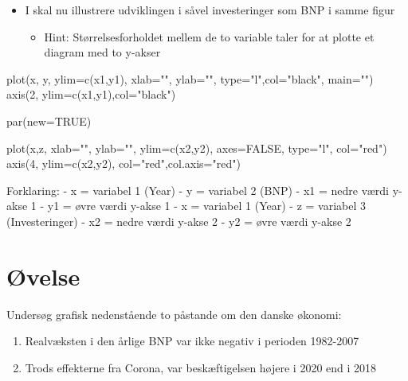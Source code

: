 \documentclass[
  12pt,
]{article}
\newenvironment{Shaded}{\begin{snugshade}}{\end{snugshade}}
\newcommand{\AttributeTok}[1]{\textcolor[rgb]{0.77,0.63,0.00}{#1}}
\newcommand{\ConstantTok}[1]{\textcolor[rgb]{0.00,0.00,0.00}{#1}}
\newcommand{\DecValTok}[1]{\textcolor[rgb]{0.00,0.00,0.81}{#1}}
\newcommand{\FunctionTok}[1]{\textcolor[rgb]{0.00,0.00,0.00}{#1}}
\newcommand{\NormalTok}[1]{#1}
\newcommand{\StringTok}[1]{\textcolor[rgb]{0.31,0.60,0.02}{#1}}
\providecommand{\tightlist}{%
  \setlength{\itemsep}{0pt}\setlength{\parskip}{0pt}}
\begin{document}
\begin{itemize}
\tightlist
\item
  I skal nu illustrere udviklingen i såvel investeringer som BNP i samme
  figur

  \begin{itemize}
  \tightlist
  \item
    Hint: Størrelsesforholdet mellem de to variable taler for at plotte
    et diagram med to y-akser
  \end{itemize}
\end{itemize}

\begin{Shaded}
\begin{Highlighting}[]
\FunctionTok{plot}\NormalTok{(x, y, }\AttributeTok{ylim=}\FunctionTok{c}\NormalTok{(x1,y1), }\AttributeTok{xlab=}\StringTok{""}\NormalTok{, }\AttributeTok{ylab=}\StringTok{""}\NormalTok{, }
\AttributeTok{type=}\StringTok{"l"}\NormalTok{,}\AttributeTok{col=}\StringTok{"black"}\NormalTok{, }\AttributeTok{main=}\StringTok{""}\NormalTok{)}
\FunctionTok{axis}\NormalTok{(}\DecValTok{2}\NormalTok{, }\AttributeTok{ylim=}\FunctionTok{c}\NormalTok{(x1,y1),}\AttributeTok{col=}\StringTok{"black"}\NormalTok{)  }
  
\FunctionTok{par}\NormalTok{(}\AttributeTok{new=}\ConstantTok{TRUE}\NormalTok{)}
  
\FunctionTok{plot}\NormalTok{(x,z, }\AttributeTok{xlab=}\StringTok{""}\NormalTok{, }\AttributeTok{ylab=}\StringTok{""}\NormalTok{, }\AttributeTok{ylim=}\FunctionTok{c}\NormalTok{(x2,y2), }
    \AttributeTok{axes=}\ConstantTok{FALSE}\NormalTok{, }\AttributeTok{type=}\StringTok{"l"}\NormalTok{, }\AttributeTok{col=}\StringTok{"red"}\NormalTok{)}
\FunctionTok{axis}\NormalTok{(}\DecValTok{4}\NormalTok{, }\AttributeTok{ylim=}\FunctionTok{c}\NormalTok{(x2,y2), }\AttributeTok{col=}\StringTok{"red"}\NormalTok{,}\AttributeTok{col.axis=}\StringTok{"red"}\NormalTok{)}
\end{Highlighting}
\end{Shaded}

Forklaring: - x = variabel 1 (Year) - y = variabel 2 (BNP) - x1 = nedre
værdi y-akse 1 - y1 = øvre værdi y-akse 1 - x = variabel 1 (Year) - z =
variabel 3 (Investeringer) - x2 = nedre værdi y-akse 2 - y2 = øvre værdi
y-akse 2

\hypertarget{uxf8velse-3}{%
\section{Øvelse}\label{uxf8velse-3}}

Undersøg grafisk nedenstående to påstande om den danske økonomi:

\begin{enumerate}
\def\labelenumi{\arabic{enumi}.}
\tightlist
\item
  Realvæksten i den årlige BNP var ikke negativ i perioden 1982-2007
\item
  Trods effekterne fra Corona, var beskæftigelsen højere i 2020 end i
  2018
\end{enumerate}

  
\end{document}
